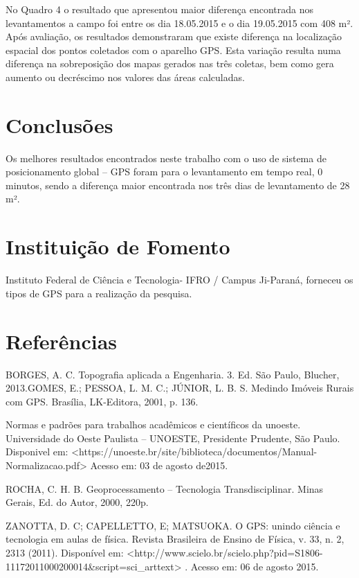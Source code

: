 \documentclass[article,12pt,onesidea,4paper,english,brazil]{abntex2}
\begin{document}
No Quadro 4 o resultado que apresentou maior diferença encontrada nos levantamentos a campo foi entre os dia 18.05.2015 e o dia 19.05.2015 com 408 m².
Após avaliação, os resultados demonstraram que existe diferença na localização espacial dos pontos coletados com o aparelho GPS. Esta variação resulta numa diferença na sobreposição dos mapas gerados nas três coletas, bem como gera aumento ou decréscimo nos valores das áreas calculadas.

	
	\section*{Conclusões}
	
	Os melhores resultados encontrados neste trabalho com o uso de sistema de posicionamento global – GPS foram para o levantamento em tempo real, 0 minutos, sendo a diferença maior encontrada nos três dias de levantamento de 28 m².
	
	\section*{Instituição de Fomento}
	
	Instituto Federal de Ciência e Tecnologia- IFRO / Campus Ji-Paraná, forneceu os tipos de GPS para a realização da pesquisa.
	
	\sloppy
	\section*{Referências}
	
	\noindent BORGES, A. C. Topografia aplicada a Engenharia. 3. Ed. São Paulo, Blucher, 2013.GOMES, E.; PESSOA, L. M. C.; JÚNIOR, L. B. S. Medindo Imóveis Rurais
	com GPS. Brasília, LK-Editora, 2001, p. 136.
	
	
	\noindent Normas e padrões para trabalhos acadêmicos e científicos da unoeste. Universidade do Oeste Paulista – UNOESTE, Presidente Prudente, São Paulo. Disponivel em: <https://unoeste.br/site/biblioteca/documentos/Manual-Normalizacao.pdf>  Acesso em: 03 de agosto de2015.
	
	\noindent ROCHA, C. H. B. Geoprocessamento – Tecnologia Transdisciplinar. Minas Gerais, Ed. do Autor, 2000, 220p.
	
	\noindent ZANOTTA, D. C; CAPELLETTO, E; MATSUOKA. O GPS: unindo ciência e
	tecnologia em aulas de física. Revista Brasileira de Ensino de Física, v. 33, n. 2, 2313 (2011). Disponível em: <http://www.scielo.br/scielo.php?pid=S1806-11172011000200014\&script=sci\_arttext> . Acesso em: 06 de agosto 2015.
\end{document}
